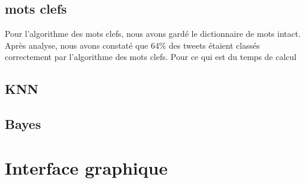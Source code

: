 \documentclass[a4paper,10pt]{report}
\begin{document}
    \subsection{mots clefs}
      Pour l'algorithme des mots clefs, nous avons gardé le dictionnaire de mots intact.
      Après analyse, nous avons constaté que 64\% des tweets étaient classés correctement par l'algorithme des mots clefs.
      Pour ce qui est du temps de calcul %
      
      
    \subsection{KNN}
      
    \subsection{Bayes}
  \section{Interface graphique}
\end{document}
